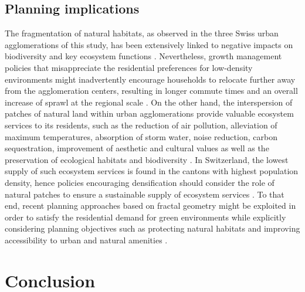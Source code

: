 \subsection*{Planning implications}

The fragmentation of natural habitats, as observed in the three Swiss urban agglomerations of this study, has been extensively linked to negative impacts on biodiversity and key ecosystem functions \citep{haddad2015habitat}.
Nevertheless, growth management policies that misappreciate the residential preferences for low-density environments might inadvertently encourage households to relocate further away from the agglomeration centers, resulting in longer commute times and an overall increase of sprawl at the regional scale \citep{schwanen2004policies, robinson2005twenty}.
On the other hand, the interspersion of patches of natural land within urban agglomerations provide valuable ecosystem services to its residents, such as the reduction of air pollution, alleviation of maximum temperatures, absorption of storm water, noise reduction, carbon sequestration, improvement of aesthetic and cultural values as well as the preservation of ecological habitats and biodiversity \citep{bolund1999ecosystem, gomez2013classifying}.
In Switzerland, the lowest supply of such ecosystem services is found in the cantons with highest population density, hence policies encouraging densification should consider the role of natural patches to ensure a sustainable supply of ecosystem services \citep{jaligot2019historical}.
To that end, recent planning approaches based on fractal geometry \citep{yamu2015spatial} might be exploited in order to satisfy the residential demand for green environments while explicitly considering planning objectives such as protecting natural habitats and improving accessibility to urban and natural amenities \citep{bosch2019addressing}.


\section*{Conclusion}

